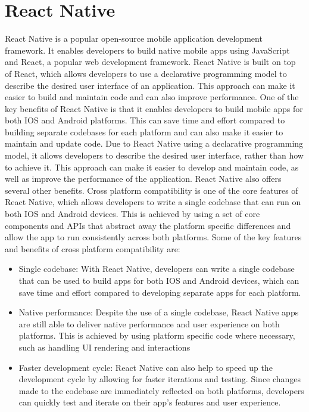\section{React Native}

React Native is a popular open-source mobile application development framework. \cite{danielsson2016react}It enables developers to build native mobile apps using JavaScript and React, a popular web development framework. React Native is built on top of React, which allows developers to use a declarative programming model to describe the desired user interface of an application. This approach can make it easier to build and maintain code and can also improve performance. 
\newline \newline
One of the key benefits of React Native is that it enables developers to build mobile apps for both IOS and Android platforms. \cite{RNbenefit} This can save time and effort compared to building separate codebases for each platform and can also make it easier to maintain and update code. Due to React Native using a declarative programming model, it allows developers to describe the desired user interface, rather than how to achieve it. This approach can make it easier to develop and maintain code, as well as improve the performance of the application. 
\newline \newline
React Native also offers several other benefits. Cross platform compatibility is one of the core features of React Native, which allows developers to write a single codebase that can run on both IOS and Android devices. This is achieved by using a set of core components and APIs that abstract away the platform specific differences and allow the app to run consistently across both platforms. Some of the key features and benefits of cross platform compatibility are:
\begin{itemize}
    \item Single codebase: With React Native, developers can write a single codebase that can be used to build apps for both IOS and Android devices, which can save time and effort compared to developing separate apps for each platform.
    \item Native performance: Despite the use of a single codebase, React Native apps are still able to deliver native performance and user experience on both platforms. This is achieved by using platform specific code where necessary, such as handling UI rendering and interactions
    \item Faster development cycle: React Native can also help to speed up the development cycle by allowing for faster iterations and testing. Since changes made to the codebase are immediately reflected on both platforms, developers can quickly test and iterate on their app’s features and user experience.
\end{itemize}	
